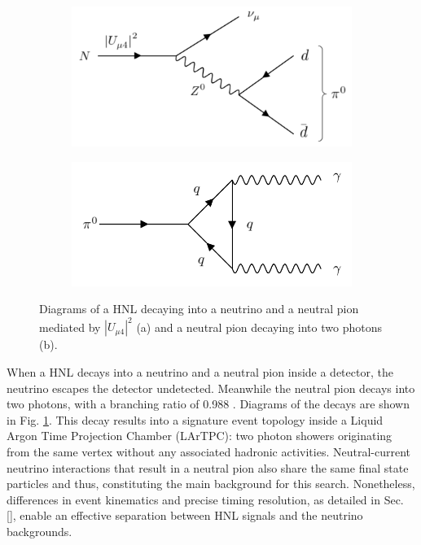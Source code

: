\begin{figure}[htbp!]
\begin{subfigure}[h]{0.49\linewidth}
\centering    
\includegraphics[width=\linewidth]{N_to_pi0_edit}
\caption{}
\end{subfigure}
\hfill
\begin{subfigure}[h]{0.49\linewidth}
\centering    
\includegraphics[width=\linewidth]{pi0_to_gam}
\caption{}
\end{subfigure}%
\caption[decayDiagram]{
Diagrams of a HNL decaying into a neutrino and a neutral pion mediated by $|U_{\mu4}|^{2}$ (a) and a neutral pion decaying into two photons (b).
}\label{fig:decayDiagram}
\end{figure}

When a HNL decays into a neutrino and a neutral pion inside a detector, the neutrino escapes the detector undetected.
Meanwhile the neutral pion decays into two photons, with a branching ratio of 0.988 \cite{pi0}. 
Diagrams of the decays are shown in Fig. \ref{fig:decayDiagram}.
This decay results into a signature event topology inside a Liquid Argon Time Projection Chamber (LArTPC): two photon showers originating from the same vertex without any associated hadronic activities.
Neutral-current neutrino interactions that result in a neutral pion also share the same final state particles and thus, constituting the main background for this search.
Nonetheless, differences in event kinematics and precise timing resolution, as detailed in Sec. \ref{}, enable an effective separation between HNL signals and the neutrino backgrounds. 

